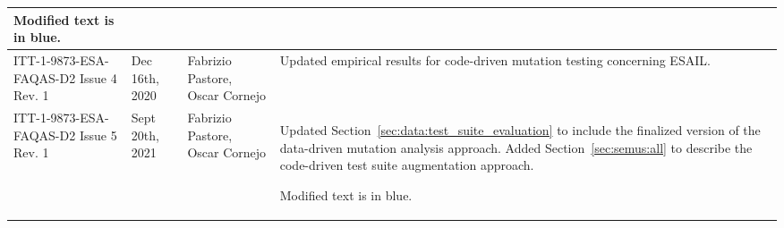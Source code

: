 \begin{longtable}{|p{2cm}|p{1cm}|p{1.5cm}|p{9cm}|@{}}
\begin{minipage}{8cm}
Modified text is in blue.
\end{minipage}

\\
\hline


ITT-1-9873-ESA-FAQAS-D2
Issue 4 Rev. 1
&Dec 16th, 2020
&Fabrizio Pastore, Oscar Cornejo
&
\begin{minipage}{8cm}
Updated empirical results for code-driven mutation testing concerning ESAIL.
\end{minipage}
\\

\hline

ITT-1-9873-ESA-FAQAS-D2
Issue 5 Rev. 1
&Sept 20th, 2021
&Fabrizio Pastore, Oscar Cornejo
&
\begin{minipage}{8cm}
Updated Section~\ref{sec:data:test_suite_evaluation} to include the finalized version of the data-driven mutation analysis approach.
Added Section~\ref{sec:semus:all} to describe the code-driven test suite augmentation approach.

Modified text is in blue.
\end{minipage}
\\

\hline
                                                    
\end{longtable}
\normalsize

\clearpage
